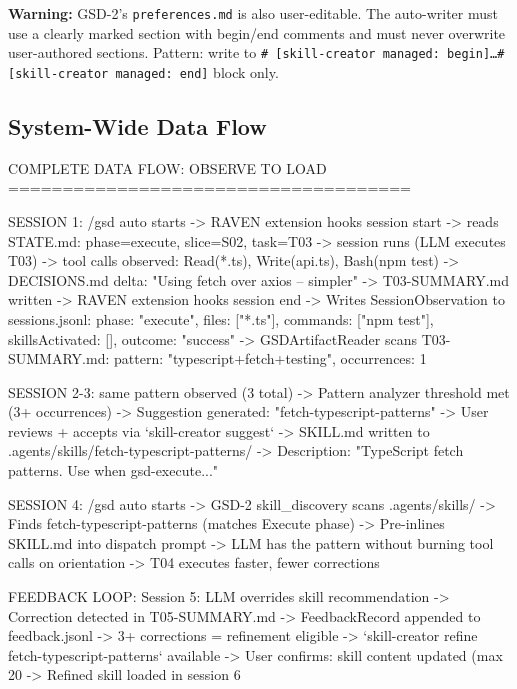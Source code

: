 \documentclass[11pt,letterpaper]{article}
\begin{document}
\begin{warnbox}
\textbf{Warning:} GSD-2's \texttt{preferences.md} is also user-editable. The auto-writer must use a clearly marked section with begin/end comments and must never overwrite user-authored sections. Pattern: write to \texttt{\# [skill-creator managed: begin]\ldots\# [skill-creator managed: end]} block only.
\end{warnbox}

\subsection{System-Wide Data Flow}

\begin{asciibox}
COMPLETE DATA FLOW: OBSERVE TO LOAD
=====================================

  SESSION 1:
  /gsd auto starts
    -> RAVEN extension hooks session start
    -> reads STATE.md: phase=execute, slice=S02, task=T03
    -> session runs (LLM executes T03)
    -> tool calls observed: Read(*.ts), Write(api.ts), Bash(npm test)
    -> DECISIONS.md delta: "Using fetch over axios -- simpler"
    -> T03-SUMMARY.md written
    -> RAVEN extension hooks session end
    -> Writes SessionObservation to sessions.jsonl:
       { phase: "execute", files: ["*.ts"], commands: ["npm test"],
         skillsActivated: [], outcome: "success" }
    -> GSDArtifactReader scans T03-SUMMARY.md:
       { pattern: "typescript+fetch+testing", occurrences: 1 }

  SESSION 2-3: same pattern observed (3 total)
    -> Pattern analyzer threshold met (3+ occurrences)
    -> Suggestion generated: "fetch-typescript-patterns"
    -> User reviews + accepts via `skill-creator suggest`
    -> SKILL.md written to .agents/skills/fetch-typescript-patterns/
    -> Description: "TypeScript fetch patterns. Use when gsd-execute..."

  SESSION 4:
  /gsd auto starts
    -> GSD-2 skill_discovery scans .agents/skills/
    -> Finds fetch-typescript-patterns (matches Execute phase)
    -> Pre-inlines SKILL.md into dispatch prompt
    -> LLM has the pattern without burning tool calls on orientation
    -> T04 executes faster, fewer corrections

  FEEDBACK LOOP:
  Session 5: LLM overrides skill recommendation
    -> Correction detected in T05-SUMMARY.md
    -> FeedbackRecord appended to feedback.jsonl
    -> 3+ corrections = refinement eligible
    -> `skill-creator refine fetch-typescript-patterns` available
    -> User confirms: skill content updated (max 20%
    -> Refined skill loaded in session 6
\end{asciibox}
\end{document}
